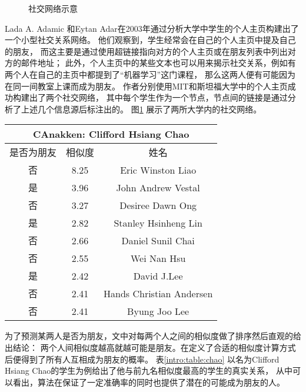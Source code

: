 \begin{figure}[h]
  \caption{社交网络示意}
  \label{intro:fig:social_net}
\end{figure}
Lada A. Adamic 和Eytan Adar在2003年通过分析大学中学生的个人主页构建出了一个小型社交关系网络\cite{adamic2003friends}。
他们观察到，学生经常会在自己的个人主页中提及自己的朋友，
而这主要是通过使用超链接指向对方的个人主页或在朋友列表中列出对方的邮件地址；
此外，个人主页中的某些文本也可以用来揭示社交关系，例如有两个人在自己的主页中都提到了“机器学习”这门课程，
那么这两人便有可能因为在同一间教室上课而成为朋友。
作者分别使用MIT和斯坦福大学中的个人主页成功构建出了两个社交网络，
其中每个学生作为一个节点，节点间的链接是通过分析了上述几个信息源后标注出的。
图\ref{intro:fig:social_net} 展示了两所大学内的社交网络。

\begin{center}
\begin{tabular}{ccc}\hline
\multicolumn{3}{c}{CAnakken: Clifford Hsiang Chao} \\ \hline
  是否为朋友 &    相似度 &   姓名 \\ \hline
  否 & 8.25 & Eric Winston Liao \\
  是 & 3.96 & John Andrew Vestal \\
  否 & 3.27 & Desiree Dawn Ong \\
  是 & 2.82 & Stanley Hsinheng Lin \\
  否 & 2.66 & Daniel Sunil Chai \\
  否 & 2.55 & Wei Nan Hsu \\
  是 & 2.42 & David J.Lee \\
  否 & 2.41 & Hands Christian Andersen \\
  否 & 2.41 & Byung Joo Lee \\ \hline
\end{tabular}
\label{intro:table:chao}
\end{center}


为了预测某两人是否为朋友，文中对每两个人之间的相似度做了排序然后直观的给出结论：
两个人间相似度越高就越可能是朋友。在定义了合适的相似度计算方式后便得到了所有人互相成为朋友的概率。
表\ref{intro:table:chao} 以名为Clifford Hsiang Chao的学生为例给出了他与前九名相似度最高的学生的真实关系，
从中可以看出，算法在保证了一定准确率的同时也提供了潜在的可能成为朋友的人。

